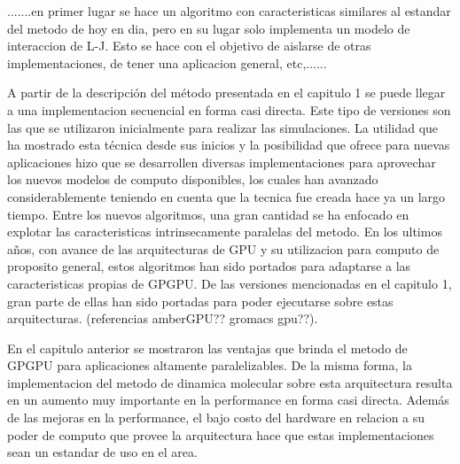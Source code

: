 \documentclass[a4paper,10pt]{report}
\begin{document}




.......en primer lugar se hace un algoritmo con caracteristicas similares al estandar del metodo de hoy en dia, pero en su lugar solo implementa un modelo de interaccion de L-J. 
Esto se hace con el objetivo de aislarse de otras implementaciones, de tener una aplicacion general, etc,......


A partir de la descripción del método presentada en el capitulo 1 se puede llegar a una implementacion secuencial en forma casi directa. Este tipo de versiones son las que se utilizaron inicialmente para realizar las simulaciones.
La utilidad que ha mostrado esta técnica desde sus inicios y la posibilidad que ofrece para nuevas aplicaciones hizo que se desarrollen diversas implementaciones para aprovechar los nuevos modelos de computo disponibles, los cuales han avanzado considerablemente teniendo en cuenta que la tecnica fue creada hace ya un largo tiempo. 
Entre los nuevos algoritmos, una gran cantidad se ha enfocado en explotar las caracteristicas intrinsecamente paralelas del metodo. En los ultimos años, con avance de las arquitecturas de GPU y su utilizacion para computo de proposito general, estos algoritmos han sido portados para adaptarse a las caracteristicas propias de GPGPU.
De las versiones mencionadas en el capitulo 1, gran parte de ellas han sido portadas para poder ejecutarse sobre estas arquitecturas. (referencias amberGPU?? gromacs gpu??).

En el capitulo anterior se mostraron las ventajas que brinda el metodo de GPGPU para aplicaciones altamente paralelizables. De la misma forma,  la implementacion del metodo de dinamica molecular sobre esta arquitectura resulta en un aumento muy importante en la performance en forma casi directa. Además de las mejoras en la performance, el bajo costo del hardware en relacion a su poder de computo que provee la arquitectura hace que estas implementaciones sean un estandar de uso en el area.  
\end{document}
